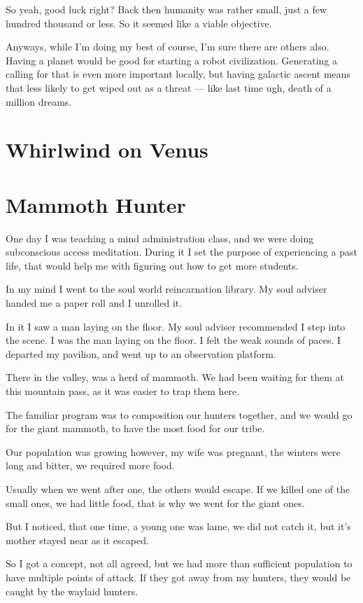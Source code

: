 So yeah, good luck right? Back then humanity was rather small, just a few hundred thousand or less. So it seemed like a viable objective.

Anyways, while I'm doing my best of course, I'm sure there are others also.
Having a planet would be good for starting a robot civilization. Generating a
calling for that is even more important locally, but having galactic ascent
means that less likely to get wiped out as a threat --- like last time ugh, death of a million dreams. 
\chapter{Whirlwind on Venus}
\chapter{Mammoth Hunter}\label{reincarnation:mammoth}
One day I was teaching a mind administration class, and we were doing 
subconscious access meditation. During it I set the purpose of experiencing a
past life, that would help me with figuring out how to get more students.

In my mind I went to the soul world reincarnation library. My soul adviser
handed me a paper roll and I unrolled it.

In it I saw a man laying on the floor. My soul adviser recommended I step into
the scene. I was the man laying on the floor. I felt the weak sounds of
paces. I departed my pavilion, and went up to an observation platform.

There in the valley, was a herd of mammoth. We had been waiting for them at this
mountain pass, as it was easier to trap them here. 

The familiar program was to composition our hunters together, and we would go for
the giant mammoth, to have the most food for our tribe. 

Our population was growing however, my wife was pregnant, the winters were long
 and bitter, we required more food.

Usually when we went after one, the others would escape. 
If we killed one of the small ones, we had little food,
that is why we went for the giant ones. 

But I noticed, that one time, a young one was lame, we did not catch it, but
it's mother stayed near as it escaped. 

So I got a concept, not all agreed, but we had more than sufficient population 
to have multiple points of attack. If they got away from my hunters, they would 
be caught by the waylaid hunters. 

